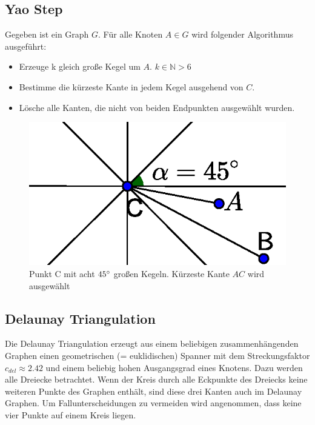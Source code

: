 \documentclass[a4paper,twoside]{IEEEtran}
\begin{document}
\subsection{Yao Step}
Gegeben ist ein Graph $G $. Für alle Knoten $A \in G $ wird folgender Algorithmus ausgeführt:
\begin{itemize}
\item Erzeuge k gleich große Kegel um $A $. $k \in \mathds{N} > 6 $
\item Bestimme die kürzeste Kante in jedem Kegel ausgehend von $C $.
\item Lösche alle Kanten, die nicht von beiden Endpunkten ausgewählt wurden.
\end{itemize}

\begin{figure}
\centering
\includegraphics[width=0.99\linewidth]{Yao_Step2.eps}
\caption{Punkt C mit acht $45\degree $ großen Kegeln. Kürzeste Kante $AC $ wird ausgewählt}
\label{fig:YaoStep2}
\end{figure}



\subsection{Delaunay Triangulation}
Die Delaunay Triangulation erzeugt aus einem beliebigen zusammenhängenden Graphen einen geometrischen (= euklidischen) Spanner mit dem Streckungsfaktor $c_{del} \approx 2.42 $ und einem beliebig hohen Ausgangsgrad eines Knotens. 
Dazu werden alle Dreiecke betrachtet.
Wenn der Kreis durch alle Eckpunkte des Dreiecks keine weiteren Punkte des Graphen enthält, sind diese drei Kanten auch im Delaunay Graphen. 
Um Fallunterscheidungen zu vermeiden wird angenommen, dass keine vier Punkte auf einem Kreis liegen. 
\end{document}
